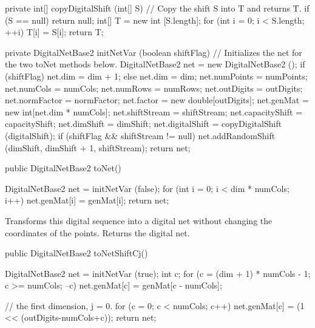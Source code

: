 \begin{code}\begin{hide}

   private int[] copyDigitalShift (int[] S) {
      // Copy the shift S into T and returns T.
      if (S == null) return null;
      int[] T = new int [S.length];
      for (int i = 0; i < S.length; ++i)
         T[i] = S[i];
      return T;
   }

   private DigitalNetBase2 initNetVar (boolean shiftFlag) {
      // Initializes the net for the two toNet methods below.
      DigitalNetBase2 net = new DigitalNetBase2 ();
      if (shiftFlag)
         net.dim = dim + 1;
      else
         net.dim = dim;
      net.numPoints = numPoints;
      net.numCols = numCols;
      net.numRows = numRows;
      net.outDigits = outDigits;
      net.normFactor = normFactor;
      net.factor = new double[outDigits];
      net.genMat = new int[net.dim * numCols];
      net.shiftStream = shiftStream;
      net.capacityShift = capacityShift;
      net.dimShift = dimShift;
      net.digitalShift = copyDigitalShift (digitalShift);
      if (shiftFlag && shiftStream != null) {
          net.addRandomShift (dimShift, dimShift + 1, shiftStream);
      }
      return net;
   } \end{hide}

   public DigitalNetBase2 toNet() \begin{hide} {
      DigitalNetBase2 net = initNetVar (false);
      for (int i = 0; i < dim * numCols; i++)
         net.genMat[i] = genMat[i];
      return net;
   }\end{hide}
\end{code} 
\begin{tabb}
   Transforms this digital sequence into a digital net without changing
   the coordinates of the points. Returns the digital net.
\end{tabb}
\begin{code}

   public DigitalNetBase2 toNetShiftCj() \begin{hide} {
      DigitalNetBase2 net = initNetVar (true);
      int c;
      for (c = (dim + 1) * numCols - 1; c >= numCols; --c)
         net.genMat[c] = genMat[c - numCols];

      // the first dimension, j = 0.
      for (c = 0; c < numCols; c++)
         net.genMat[c] = (1 << (outDigits-numCols+c));
      return net;
   }\end{hide}
\end{code} 
